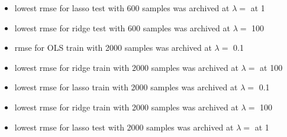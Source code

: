 \documentclass[12pt,twoside]{article}
\begin{document}
\begin{enumerate}
\begin{enumerate}
\begin{itemize}
\begin{itemize}
\item lowest rmse for lasso test with 600 samples was archived at $\lambda=$ at 1

\item lowest rmse for ridge test with 600 samples was archived at $\lambda=$ 100

 \item rmse for OLS train with 2000 samples was archived at $\lambda=$ 0.1

\item lowest rmse for ridge train with 2000 samples was archived at $\lambda=$ at 100

\item lowest rmse for lasso train with 2000 samples was archived at $\lambda=$ 0.1

\item lowest rmse for ridge train with 2000 samples was archived at $\lambda=$ 100

\item lowest rmse for lasso test with 2000 samples was archived at $\lambda=$ at 1


\end{itemize}
\end{itemize}
\end{enumerate}
\end{enumerate}
\end{document}
